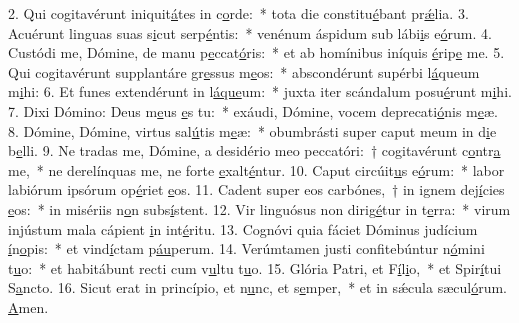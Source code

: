 2. Qui cogitavérunt iniquit\uline{á}tes in c\uline{o}rde:~* tota die constitu\uline{é}bant pr\uline{ǽ}lia.
3. Acuérunt linguas suas s\uline{i}cut serp\uline{é}ntis:~* venénum áspidum sub lábi\uline{i}s e\uline{ó}rum.
4. Custódi me, Dómine, de manu p\uline{e}ccat\uline{ó}ris:~* et ab homínibus iníquis \uline{é}rip\uline{e} me.
5. Qui cogitavérunt supplantáre gr\uline{e}ssus m\uline{e}os:~* abscondérunt supérbi l\uline{á}queum m\uline{i}hi:
6. Et funes extendérunt in l\uline{á}\uline{que}um:~* juxta iter scándalum posu\uline{é}runt m\uline{i}hi.
7. Dixi Dómino: Deus m\uline{e}us \uline{e}s tu:~* exáudi, Dómine, vocem deprecati\uline{ó}nis m\uline{e}æ.
8. Dómine, Dómine, virtus sal\uline{ú}tis m\uline{e}æ:~* obumbrásti super caput meum in d\uline{i}e b\uline{e}lli.
9. Ne tradas me, Dómine, a desidério meo peccatóri:~† cogitavérunt c\uline{o}ntr\uline{a} me,~* ne derelínquas me, ne forte \uline{e}xalt\uline{é}ntur.
10. Caput circúit\uline{u}s e\uline{ó}rum:~* labor labiórum ipsórum op\uline{é}riet \uline{e}os.
11. Cadent super eos carbónes,~† in ignem dej\uline{í}cies \uline{e}os:~* in misériis n\uline{o}n subs\uline{í}stent.
12. Vir linguósus non dirig\uline{é}tur in t\uline{e}rra:~* virum injústum mala cápient \uline{i}n int\uline{é}ritu.
13. Cognóvi quia fáciet Dóminus judícium \uline{í}n\uline{o}pis:~* et vind\uline{í}ctam p\uline{áu}perum.
14. Verúmtamen justi confitebúntur n\uline{ó}mini t\uline{u}o:~* et habitábunt recti cum v\uline{u}ltu t\uline{u}o.
15. Glória Patri, et F\uline{í}l\uline{i}o,~* et Spir\uline{í}tui S\uline{a}ncto.
16. Sicut erat in princípio, et n\uline{u}nc, et s\uline{e}mper,~* et in sǽcula sæcul\uline{ó}rum. \uline{A}men.
